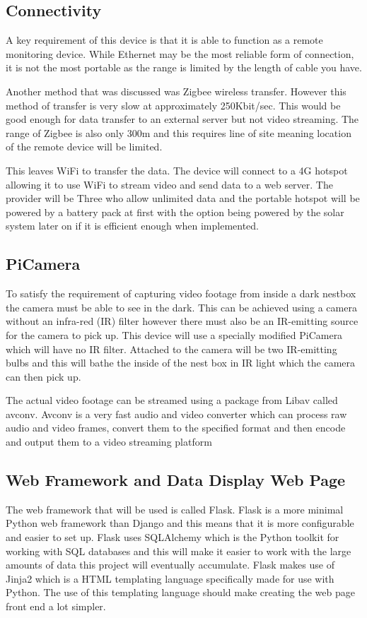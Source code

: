 \documentclass[10pt,a4paper]{article}
\begin{document}
\subsection{Connectivity}
A key requirement of this device is that it is able to function as a remote monitoring device. While Ethernet may be the most reliable form of connection, it is not the most portable as the range is limited by the length of cable you have. 

Another method that was discussed was Zigbee wireless transfer. However this method of transfer is very slow at approximately 250Kbit/sec. This would be good enough for data transfer to an external server but not video streaming. The range of Zigbee is also only 300m and this requires line of site meaning location of the remote device will be limited. 

This leaves WiFi to transfer the data. The device will connect to a 4G hotspot allowing it to use WiFi to stream video and send data to a web server. The provider will be Three who allow unlimited data and the portable hotspot will be powered by a battery pack at first with the option being powered by the solar system later on if it is efficient enough when implemented. 

\subsection{PiCamera}
To satisfy the requirement of capturing video footage from inside a dark nestbox the camera must be able to see in the dark. This can be achieved using a camera without an infra-red (IR) filter however there must also be an IR-emitting source for the camera to pick up. This device will use a specially modified PiCamera which will have no IR filter. Attached to the camera will be two IR-emitting bulbs and this will bathe the inside of the nest box in IR light which the camera can then pick up. 

The actual video footage can be streamed using a package from Libav called avconv. Avconv is a very fast audio and video converter which can process raw audio and video frames, convert them to the specified format and then encode and output them to a video streaming platform\citep{avconv}

\subsection{Web Framework and Data Display Web Page}
The web framework that will be used is called Flask. Flask is a more minimal Python web framework than Django and this means that it is more configurable and easier to set up. Flask uses SQLAlchemy which is the Python toolkit for working with SQL databases and this will make it easier to work with the large amounts of data this project will eventually accumulate. Flask makes use of Jinja2 which is a HTML templating language specifically made for use with Python. The use of this templating language should make creating the web page front end a lot simpler.
\end{document}
